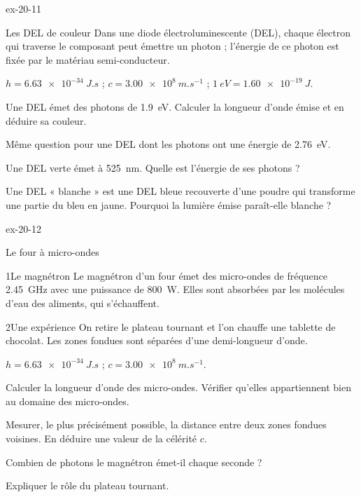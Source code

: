 \begin{blocLivre}{ex-20-11}
\begin{exercice}[2]{Les DEL de couleur}
Dans une diode électroluminescente (DEL), chaque électron qui traverse le composant peut émettre un photon ; l'énergie de ce photon est
fixée par le matériau semi-conducteur.
\begin{donnees}
$h=\qty{6,63e-34}{J.s}$ ; $c=\qty{3,00e8}{m.s^{-1}}$ ; $\qty{1}{eV}=\qty{1,60e-19}{J}$.
\end{donnees}
\begin{questions}
\item Une DEL émet des photons de \qty{1,9}{eV}. Calculer la longueur d'onde émise et en déduire sa couleur.
\item Même question pour une DEL dont les photons ont une énergie de \qty{2,76}{eV}.
\item Une DEL verte émet à \qty{525}{nm}. Quelle est l'énergie de ses photons ?
\item Une DEL « blanche » est une DEL bleue recouverte d'une poudre qui transforme une partie du bleu en jaune. Pourquoi la lumière
émise paraît-elle blanche ?
\end{questions}
\end{exercice}
\end{blocLivre}
\begin{blocLivre}{ex-20-12}
\begin{exercice}[3]{Le four à micro-ondes}
\begin{docu}{1}{Le magnétron}
Le magnétron d'un four émet des micro-ondes de fréquence \qty{2,45}{GHz} avec une puissance de \qty{800}{W}. Elles sont absorbées par les
molécules d'eau des aliments, qui s'échauffent.
\end{docu}
\begin{docu}{2}{Une expérience}
On retire le plateau tournant et l'on chauffe une tablette de chocolat. Les zones fondues sont séparées d'une demi-longueur d'onde.
\end{docu}
\begin{donnees}
$h=\qty{6,63e-34}{J.s}$ ; $c=\qty{3,00e8}{m.s^{-1}}$.
\end{donnees}
\begin{questions}
\item Calculer la longueur d'onde des micro-ondes. Vérifier qu'elles appartiennent bien au domaine des micro-ondes.
\item Mesurer, le plus précisément possible, la distance entre deux zones fondues voisines. En déduire une valeur de la célérité $c$.
\item \initiative Combien de photons le magnétron émet-il chaque seconde ?
\item Expliquer le rôle du plateau tournant.
\end{questions}
\end{exercice}
\end{blocLivre}
